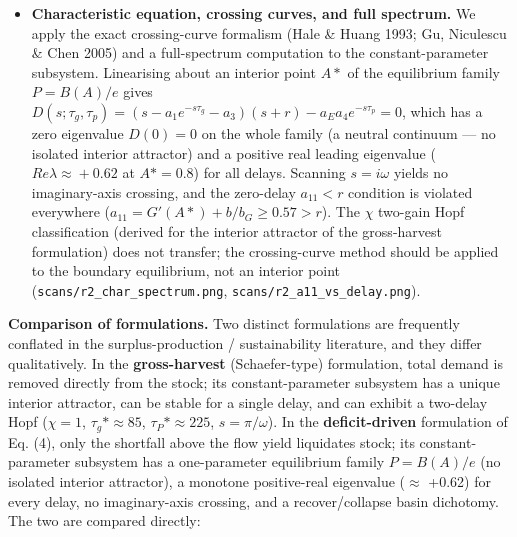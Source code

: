 \documentclass[11pt]{article}
\begin{document}
\begin{itemize}
\item \textbf{Characteristic equation, crossing curves, and full spectrum.} We apply the exact crossing-curve formalism (Hale \& Huang 1993; Gu, Niculescu \& Chen 2005) and a full-spectrum computation to the constant-parameter subsystem. Linearising about an interior point $A*$ of the equilibrium family $P=B(A)/e$ gives $D(s;\tau{}_{g},\tau{}_{p})=(s-a_{1}e^{-s\tau{}_{g}}-a_{3})(s+r)-a_{E} a_{4}e^{-s\tau{}_{p}}=0$, which has a zero eigenvalue $D(0)=0$ on the whole family (a neutral continuum — no isolated interior attractor) and a positive real leading eigenvalue ($Re \lambda{} \approx{} +0.62$ at $A*=0.8$) for all delays. Scanning $s=i\omega{}$ yields no imaginary-axis crossing, and the zero-delay $a_{11}<r$ condition is violated everywhere ($a_{11}=G'(A*)+b/b_{G} \geq{} 0.57 > r$). The $\chi{}$ two-gain Hopf classification (derived for the interior attractor of the gross-harvest formulation) does not transfer; the crossing-curve method should be applied to the boundary equilibrium, not an interior point (\texttt{scans/r2\_char\_spectrum.png}, \texttt{scans/r2\_a11\_vs\_delay.png}).
\end{itemize}

\textbf{Comparison of formulations.} Two distinct formulations are frequently conflated in the surplus-production / sustainability literature, and they differ qualitatively. In the \textbf{gross-harvest} (Schaefer-type) formulation, total demand is removed directly from the stock; its constant-parameter subsystem has a unique interior attractor, can be stable for a single delay, and can exhibit a two-delay Hopf ($\chi{}=1$, $\tau{}_{g}*\approx{}85$, $\tau{}_{P}*\approx{}225$, $s=\pi{}/\omega{}$). In the \textbf{deficit-driven} formulation of Eq. (4), only the shortfall above the flow yield liquidates stock; its constant-parameter subsystem has a one-parameter equilibrium family $P = B(A)/e$ (no isolated interior attractor), a monotone positive-real eigenvalue (\ensuremath{\approx{}} +0.62) for every delay, no imaginary-axis crossing, and a recover/collapse basin dichotomy. The two are compared directly:
\end{document}
